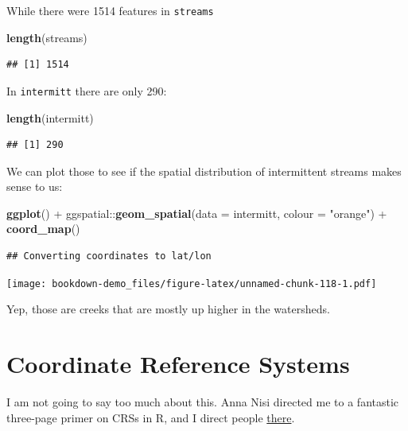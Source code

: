 \documentclass[]{book}
\newenvironment{Shaded}{\begin{snugshade}}{\end{snugshade}}
\newcommand{\KeywordTok}[1]{\textcolor[rgb]{0.13,0.29,0.53}{\textbf{{#1}}}}
\newcommand{\DataTypeTok}[1]{\textcolor[rgb]{0.13,0.29,0.53}{{#1}}}
\newcommand{\StringTok}[1]{\textcolor[rgb]{0.31,0.60,0.02}{{#1}}}
\newcommand{\NormalTok}[1]{{#1}}
\theoremstyle{definition}
\theoremstyle{definition}
\theoremstyle{remark}
\begin{document}
While there were 1514 features in \texttt{streams}

\begin{Shaded}
\begin{Highlighting}[]
\KeywordTok{length}\NormalTok{(streams)}
\end{Highlighting}
\end{Shaded}

\begin{verbatim}
## [1] 1514
\end{verbatim}

In \texttt{intermitt} there are only 290:

\begin{Shaded}
\begin{Highlighting}[]
\KeywordTok{length}\NormalTok{(intermitt)}
\end{Highlighting}
\end{Shaded}

\begin{verbatim}
## [1] 290
\end{verbatim}

We can plot those to see if the spatial distribution of intermittent
streams makes sense to us:

\begin{Shaded}
\begin{Highlighting}[]
\KeywordTok{ggplot}\NormalTok{() +}
\StringTok{  }\NormalTok{ggspatial::}\KeywordTok{geom_spatial}\NormalTok{(}\DataTypeTok{data =} \NormalTok{intermitt, }\DataTypeTok{colour =} \StringTok{"orange"}\NormalTok{) +}
\StringTok{  }\KeywordTok{coord_map}\NormalTok{()}
\end{Highlighting}
\end{Shaded}

\begin{verbatim}
## Converting coordinates to lat/lon
\end{verbatim}

\texttt{[image: bookdown-demo\_files/figure-latex/unnamed-chunk-118-1.pdf]}

Yep, those are creeks that are mostly up higher in the watersheds.

\section{Coordinate Reference
Systems}\label{coordinate-reference-systems}

I am not going to say too much about this. Anna Nisi directed me to a
fantastic three-page primer on CRSs in R, and I direct people
\href{https://www.nceas.ucsb.edu/~frazier/RSpatialGuides/OverviewCoordinateReferenceSystems.pdf}{there}.
\end{document}

